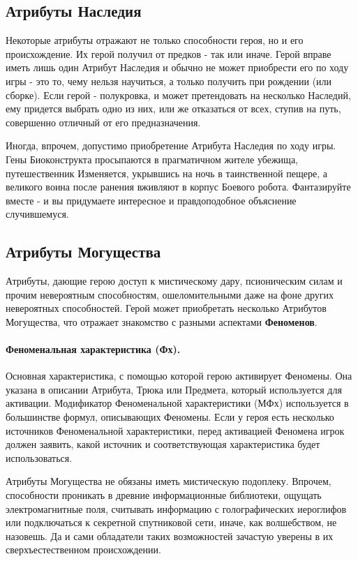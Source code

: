 \subsection{Атрибуты Наследия}
Некоторые атрибуты отражают не только способности героя, но и его происхождение. Их герой получил от предков - так или иначе. Герой вправе иметь лишь один Атрибут Наследия и обычно не может приобрести его по ходу игры - это то, чему нельзя научиться, а только получить при рождении (или сборке). Если герой - полукровка, и может претендовать на несколько Наследий, ему придется выбрать одно из них, или же отказаться от всех, ступив на путь, совершенно отличный от его предназначения.
\begin{tcolorbox}
	Иногда, впрочем, допустимо приобретение Атрибута Наследия по ходу игры. Гены Биоконструкта просыпаются в прагматичном жителе убежища, путешественник Изменяется, укрывшись на ночь в таинственной пещере, а великого воина после ранения вживляют в корпус Боевого робота. Фантазируйте вместе - и вы придумаете интересное и правдоподобное объяснение случившемуся.
\end{tcolorbox}

\subsection{Атрибуты Могущества}
Атрибуты, дающие герою доступ к мистическому дару, псионическим силам и прочим невероятным способностям, ошеломительными даже на фоне других невероятных способностей. Герой может приобретать несколько Атрибутов Могущества, что отражает знакомство с разными аспектами \textbf{Феноменов}.
\paragraph{Феноменальная характеристика (Фх).} Основная характеристика, с помощью которой герою активирует Феномены. Она указана в описании Атрибута, Трюка или Предмета, который используется для активации. Модификатор Феноменальной характеристики (МФх) используется в большинстве формул, описывающих Феномены. 
\newline Если у героя есть несколько источников Феноменальной характеристики, перед активацией Феномена игрок должен заявить, какой источник и соответствующая характеристика будет использоваться.
\begin{tcolorbox}
    Атрибуты Могущества не обязаны иметь мистическую подоплеку. Впрочем, способности проникать в древние информационные библиотеки, ощущать электромагнитные поля, считывать информацию с голографических иероглифов или подключаться к секретной спутниковой сети, иначе, как волшебством, не назовешь. Да и сами обладатели таких возможностей зачастую уверены в их сверхъестественном происхождении.
\end{tcolorbox}

